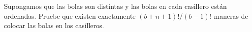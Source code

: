 \begin{statement}{2}
  Supongamos que las bolas son distintas y las bolas en cada casillero est\'an ordenadas.
  Pruebe que existen exactamente $(b + n + 1)! / (b - 1)!$ maneras de colocar las bolas en los casilleros.
\end{statement}